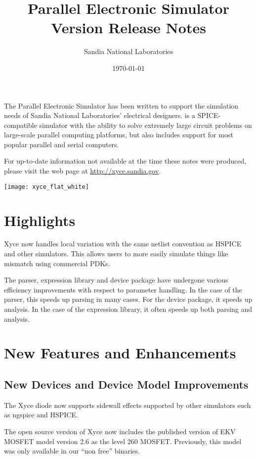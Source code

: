 \documentclass[letterpaper]{scrartcl}
\title{\XyceTitle{} Parallel Electronic Simulator\\
Version \XyceVersionVar{} Release Notes}
\author{ Sandia National Laboratories}
\date{\today}
\begin{document}
\maketitle

The \XyceTM{} Parallel Electronic Simulator has been written to support the
simulation needs of Sandia National Laboratories' electrical designers.
\XyceTM{} is a SPICE-compatible simulator with the ability to solve extremely
large circuit problems on large-scale parallel computing platforms, but also
includes support for most popular parallel and serial computers.

For up-to-date information not available at the time these notes were produced,
please visit the \XyceTM{} web page at
{\color{XyceDeepRed}\url{http://xyce.sandia.gov}}.

\tableofcontents
\vspace*{\fill}
\parbox{\textwidth}
{
  \hfill
  \texttt{[image: xyce\_flat\_white]}
}


\newpage

\section*{Highlights}
\begin{XyceItemize}
\item Xyce now handles local variation with the same netlist convention as
      HSPICE and other simulators.  This allows users to more easily simulate
      things like mismatch using commercial PDKs.

\item The parser, expression library and device package have undergone various
      efficiency improvements with respect to parameter handling.  In the case
      of the parser, this speeds up parsing in many cases.  For the device
      package, it speeds up analysis.  In the case of the expression library, it
      often speeds up both parsing and analysis.
\end{XyceItemize}

\section{New Features and Enhancements}

\subsection*{New Devices and Device Model Improvements}
\begin{XyceItemize}
\item The Xyce diode now supports sidewall effects supported by other
  simulators such as ngspice and HSPICE.
\item The open source version of Xyce now includes the published
  version of EKV MOSFET model version 2.6 as the level 260 MOSFET.
  Previously, this model was only available in our ``non free''
  binaries.
\end{XyceItemize}
\end{document}
